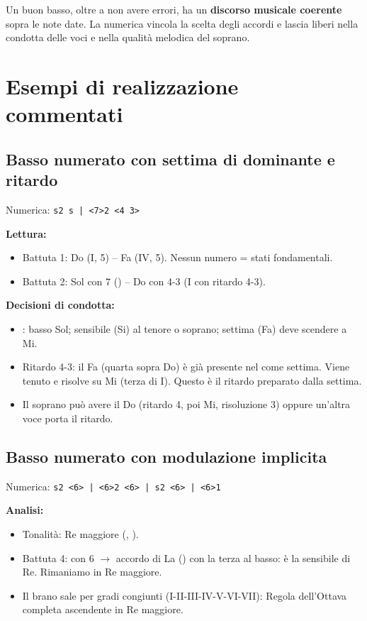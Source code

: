 Un buon basso, oltre a non avere errori, ha un \textbf{discorso musicale coerente} sopra le note date. La numerica vincola la scelta degli accordi e lascia liberi nella condotta delle voci e nella qualità melodica del soprano.

\section{Esempi di realizzazione commentati}
\label{sec:esempi_realizzazione}

\subsection{Basso numerato con settima di dominante e ritardo}

Numerica: \texttt{s2 s | <7>2 <4 3>}

\textbf{Lettura:}
\begin{itemize}
	\item Battuta 1: Do (I, 5) -- Fa (IV, 5). Nessun numero = stati fondamentali.
	\item Battuta 2: Sol con 7 () -- Do con 4-3 (I con ritardo 4-3).
\end{itemize}

\textbf{Decisioni di condotta:}
\begin{itemize}
	\item {}: basso Sol; sensibile (Si) al tenore o soprano; settima (Fa) deve scendere a Mi.
	\item Ritardo 4-3: il Fa (quarta sopra Do) è già presente nel  come settima. Viene tenuto e risolve su Mi (terza di I). Questo è il ritardo preparato dalla settima.
	\item Il soprano può avere il Do (ritardo 4, poi Mi, risoluzione 3) oppure un'altra voce porta il ritardo.
\end{itemize}


\subsection{Basso numerato con modulazione implicita}

Numerica: \texttt{s2 <6> | <6>2 <6> | s2 <6> | <6>1}

\textbf{Analisi:}
\begin{itemize}
	\item Tonalità: Re maggiore (\Fadiesis{}, \Dodiesis{}).
	\item Battuta 4: \Dodiesis{} con 6 $\rightarrow$ accordo di La () con la terza al basso: \Dodiesis{} è la sensibile di Re. Rimaniamo in Re maggiore.
	\item Il brano sale per gradi congiunti (I-II-III-IV-V-VI-VII): Regola dell'Ottava completa ascendente in Re maggiore.
\end{itemize}

